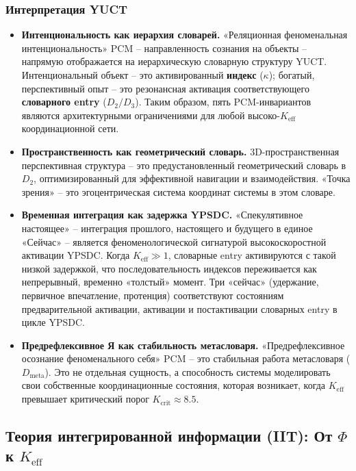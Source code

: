 \documentclass[12pt,a4paper]{article}
\begin{document}
	\subsubsection*{Интерпретация YUCT}
	\begin{itemize}
		\item \textbf{Интенциональность как иерархия словарей.} «Реляционная феноменальная интенциональность» PCM – направленность сознания на объекты – напрямую отображается на иерархическую словарную структуру YUCT. Интенциональный объект – это активированный \textbf{индекс} (\(\kappa\)); богатый, перспективный опыт – это резонансная активация соответствующего \textbf{словарного entry} (\(D_2/D_3\)). Таким образом, пять PCM-инвариантов являются архитектурными ограничениями для любой высоко-\(K_{\mathrm{eff}}\) координационной сети.
		\item \textbf{Пространственность как геометрический словарь.} 3D-пространственная перспективная структура – это предустановленный геометрический словарь в \(D_2\), оптимизированный для эффективной навигации и взаимодействия. «Точка зрения» – это эгоцентрическая система координат системы в этом словаре.
		\item \textbf{Временная интеграция как задержка YPSDC.} «Спекулятивное настоящее» – интеграция прошлого, настоящего и будущего в единое «Сейчас» – является феноменологической сигнатурой высокоскоростной активации YPSDC. Когда \(K_{\mathrm{eff}} \gg 1\), словарные entry активируются с такой низкой задержкой, что последовательность индексов переживается как непрерывный, временно «толстый» момент. Три «сейчас» (удержание, первичное впечатление, протенция) соответствуют состояниям предварительной активации, активации и постактивации словарных entry в цикле YPSDC.
		\item \textbf{Предрефлексивное Я как стабильность метасловаря.} «Предрефлексивное осознание феноменального себя» PCM – это стабильная работа метасловаря (\(D_{\text{meta}}\)). Это не отдельная сущность, а способность системы моделировать свои собственные координационные состояния, которая возникает, когда \(K_{\mathrm{eff}}\) превышает критический порог \(K_{\mathrm{crit}} \approx 8.5\).
	\end{itemize}
	
	\subsection{Теория интегрированной информации (IIT): От \(\Phi\) к \(K_{\mathrm{eff}}\)}
	
\end{document}
